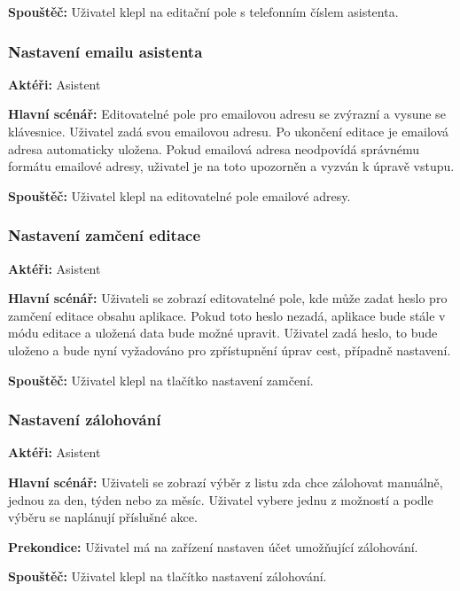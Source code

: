 \documentclass[czech,master,public,dept460,male,java,cpdeclaration]{diploma}
\newcommand{\usecase}[2]{\subsubsection{#1}\label{#2}}
\begin{document}
\vspace{0.1cm}
\noindent
\textbf{Spouštěč:} Uživatel klepl na editační pole s telefonním číslem asistenta.

\usecase{Nastavení emailu asistenta}{nastaveniemailu}
\textbf{Aktéři:} Asistent

\vspace{0.1cm}
\noindent
\textbf{Hlavní scénář:} Editovatelné pole pro emailovou adresu se zvýrazní a vysune se klávesnice.
Uživatel zadá svou emailovou adresu. Po ukončení editace je emailová adresa automaticky uložena.
Pokud emailová adresa neodpovídá správnému formátu emailové adresy, uživatel je na toto upozorněn
a vyzván k úpravě vstupu.

\vspace{0.1cm}
\noindent
\textbf{Spouštěč:} Uživatel klepl na editovatelné pole emailové adresy.


\usecase{Nastavení zamčení editace}{nastavenizamceni}
\textbf{Aktéři:} Asistent

\vspace{0.1cm}
\noindent
\textbf{Hlavní scénář:} Uživateli se zobrazí editovatelné pole, kde může zadat heslo pro zamčení editace
obsahu aplikace. Pokud toto heslo nezadá, aplikace bude stále v módu editace a uložená data bude možné upravit.
Uživatel zadá heslo, to bude uloženo a bude nyní vyžadováno pro zpřístupnění úprav cest, případně nastavení.

\vspace{0.1cm}
\noindent
\textbf{Spouštěč:} Uživatel klepl na tlačítko nastavení zamčení.

\usecase{Nastavení zálohování}{nastavenizalohovani}
\textbf{Aktéři:} Asistent

\vspace{0.1cm}
\noindent
\textbf{Hlavní scénář:} Uživateli se zobrazí výběr z listu zda chce zálohovat manuálně, jednou za den, týden
nebo za měsíc. Uživatel vybere jednu z možností a podle výběru se naplánují příslušné akce.

\vspace{0.1cm}
\noindent
\textbf{Prekondice:} Uživatel má na zařízení nastaven účet umožňující zálohování.

\vspace{0.1cm}
\noindent
\textbf{Spouštěč:} Uživatel klepl na tlačítko nastavení zálohování.
\end{document}
